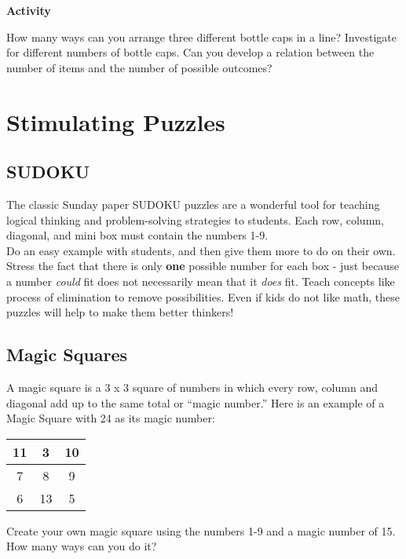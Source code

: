 	\noindent \textbf{Activity}
	
	\noindent How many ways can you arrange three different bottle caps in a line? Investigate for different numbers of bottle caps. Can you develop a relation between the number of items and the number of possible outcomes?





\section{Stimulating Puzzles}
	\subsection{SUDOKU} \label{sudoku}
	The classic Sunday paper SUDOKU puzzles are a wonderful tool for teaching logical thinking and problem-solving strategies to students. Each row, column, diagonal, and mini box must contain the numbers 1-9. \\
	
	\noindent Do an easy example with students, and then give them more to do on their own. Stress the fact that there is only \textbf{one} possible number for each box - just because a number \emph{could} fit does not necessarily mean that it \emph{does} fit. Teach concepts like process of elimination to remove possibilities. Even if kids do not like math, these puzzles will help to make them better thinkers!
	
	\subsection{Magic Squares}
	A magic square is a 3 x 3 square of numbers in which every row, column and diagonal add up to the same total or ``magic number.'' Here is an example of a Magic Square with 24 as its magic number:
	\begin{center}
	\begin{tabular}{|c|c|c|} \hline
	11 & 3 & 10 \\ \hline
	7 & 8 & 9 \\ \hline
	6 & 13 & 5 \\ \hline
	\end{tabular}
	\end{center}
	Create your own magic square using the numbers 1-9 and a magic number of 15. How many ways can you do it?\\
	
